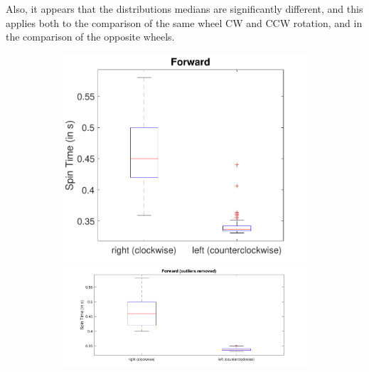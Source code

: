 \documentclass[a4paper,twoside]{book}
\begin{document}
\begin{description}
  Also, it appears that the distributions medians are significantly different, and this applies both to the comparison of the same wheel CW and CCW rotation, and in the comparison of the opposite wheels.

\begin{figure}[h]
  \begin{subfigure}[t]{0.4\textwidth}
  \includegraphics[width=\textwidth, center]{img/forward}\\[1cm]
  \includegraphics[width=\textwidth, center]{img/forward2}
  \end{subfigure}
  \quad
  \begin{subfigure}[t]{0.4\textwidth}

\end{subfigure}
\end{figure}
\end{description}
\end{document}
